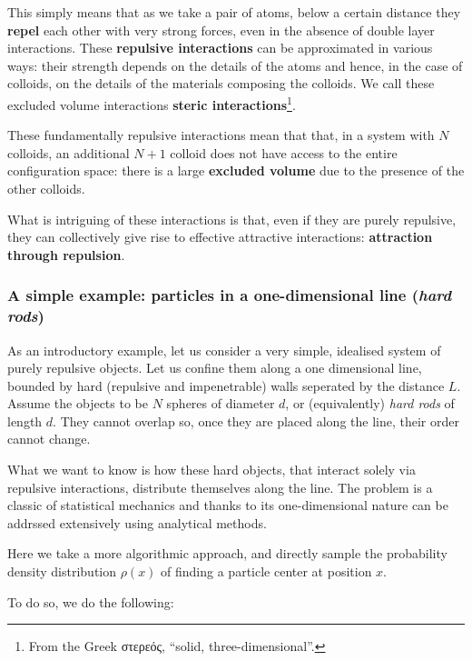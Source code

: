 \documentclass[
  letterpaper,
  enabledeprecatedfontcommands]{report}
\begin{document}
This simply means that as we take a pair of atoms, below a certain
distance they \textbf{repel} each other with very strong forces, even in
the absence of double layer interactions. These \textbf{repulsive
interactions} can be approximated in various ways: their strength
depends on the details of the atoms and hence, in the case of colloids,
on the details of the materials composing the colloids. We call these
excluded volume interactions \textbf{steric interactions}\footnote{From
  the Greek στερεός, ``solid, three-dimensional''.}.

These fundamentally repulsive interactions mean that that, in a system
with \(N\) colloids, an additional \(N+1\) colloid does not have access
to the entire configuration space: there is a large \textbf{excluded
volume} due to the presence of the other colloids.

What is intriguing of these interactions is that, even if they are
purely repulsive, they can collectively give rise to effective
attractive interactions: \textbf{attraction through repulsion}.

\subsubsection{\texorpdfstring{A simple example: particles in a
one-dimensional line (\emph{hard
rods})}{A simple example: particles in a one-dimensional line (hard rods)}}\label{a-simple-example-particles-in-a-one-dimensional-line-hard-rods}

As an introductory example, let us consider a very simple, idealised
system of purely repulsive objects. Let us confine them along a one
dimensional line, bounded by hard (repulsive and impenetrable) walls
seperated by the distance \(L\). Assume the objects to be \(N\) spheres
of diameter \(d\), or (equivalently) \emph{hard rods} of length \(d\).
They cannot overlap so, once they are placed along the line, their order
cannot change.

What we want to know is how these hard objects, that interact solely via
repulsive interactions, distribute themselves along the line. The
problem is a classic of statistical mechanics and thanks to its
one-dimensional nature can be addrssed extensively using analytical
methods.

Here we take a more algorithmic approach, and directly sample the
probability density distribution \(\rho(x)\) of finding a particle
center at position \(x\).

To do so, we do the following:
\end{document}
